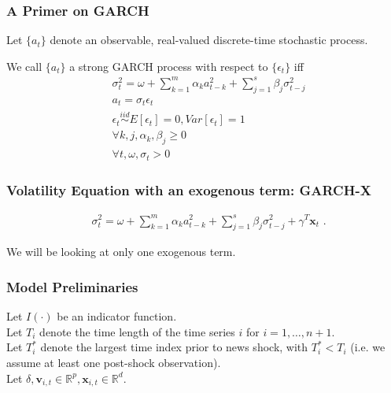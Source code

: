 \documentclass[9pt]{beamer}
\newcommand{\x}{\textbf{x}}
\newcommand{\simiid}{\stackrel{iid}{\sim}} %
\theoremstyle{definition}
\begin{document}
\begin{frame}
    \frametitle{A Primer on GARCH}
   
    \begin{Definition}

    Let $\{a_{t}\}$ denote an observable, real-valued discrete-time stochastic process.\\
    
    \bigbreak
    
    We call $\{a_{t}\}$ a strong GARCH process \parencite[][]{francq2019garch} with respect to $\{\epsilon_{t}\}$ iff 
    \begin{align*}
        &\sigma_{t}^{2} = \omega + \sum^{m}_{k=1}\alpha_{k}a^{2}_{t-k} + \sum_{j=1}^{s}\beta_{j}\sigma_{t-j}^{2}\\
        &a_{t} = \sigma_{t}\epsilon_{t}\\
        &\epsilon_{t} \simiid E[\epsilon_{t}]=0, Var[\epsilon_{t}] = 1\\
        &\forall k,j, \alpha_{k},\beta_{j}\geq 0\\ 
        &\forall t, \omega, \sigma_{t} > 0 
        \end{align*}

    \end{Definition}

\end{frame}

\begin{frame}
    \frametitle{Volatility Equation with an exogenous term: GARCH-X}
    
    \begin{align*}
        &\sigma_{t}^{2} = \omega+ \sum^{m}_{k=1}\alpha_{k}a^{2}_{t-k} + \sum_{j=1}^{s}\beta_{j}\sigma_{t-j}^{2} + \gamma^{T}\x_{t} \text{ .}\label{GARCH-X}
    \end{align*}

    We will be looking at only one exogenous term.

    \end{frame}
    
\begin{frame}
    \frametitle{Model Preliminaries}

    \fontsize{8}{7.2}

    Let $I(\cdot)$ be an indicator function.  \\
\bigbreak
    Let $T_i$ denote the time length of the time series $i$ for $i = 1, \ldots, n+1$.\\
    \bigbreak
    Let $T_i^*$ denote the largest time index prior to news shock, with $T_i^* < T_i$ (i.e. we assume at least one post-shock observation). \\
    \bigbreak
    Let $\delta, \textbf{v}_{i,t} \in \mathbb{R}^{p},  \x_{i,t} \in \mathbb{R}^{d}$.  
\end{frame}
\end{document}
